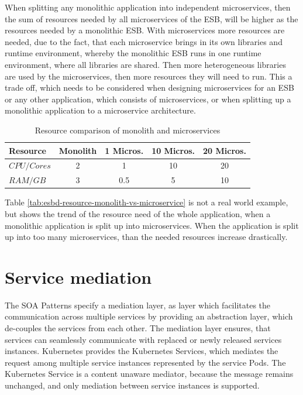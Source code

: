 When splitting any monolithic application into independent microservices, then the sum of resources needed by all microservices of the ESB, will be higher as the resources needed by a monolithic ESB. With microservices more resources are needed, due to the fact, that each microservice brings in its own libraries and runtime environment, whereby the monolithic ESB runs in one runtime environment, where all libraries are shared. Then more heterogeneous libraries are used by the microservices, then more resources they will need to run. This a trade off, which needs to be considered when designing microservices for an ESB or any other application, which consists of microservices, or when splitting up a monolithic application to a microservice architecture.
\newpage
{\renewcommand{\arraystretch}{1.2}%
%
	\begin{table}[h]
		\begin{tabularx}{\textwidth}{ m|c|c|c|c }	
			\textbf{Resource}    & \textbf{Monolith} & \textbf{1 Micros.} & \textbf{10 Micros.} & \textbf{20 Micros.} \\  \hline
			\textit{$CPU/Cores$} & 2                 & 1                  & 10                  & 20 \\
			\textit{$RAM/GB$}    & 3                 & 0.5                & 5                   & 10 \\ \hline
		\end{tabularx}
		\caption{Resource comparison of monolith and microservices}
		\label{tab:esbd-resource-monolith-vs-microservice}
\end{table}}

Table \vref{tab:esbd-resource-monolith-vs-microservice} is not a real world example, but shows the trend of the resource need of the whole application, when a monolithic application is split up into microservices. When the application is split up into too many microservices, than the needed resources increase drastically. \\

\section{Service mediation}
\label{sec:esbd-service-mediation}
The SOA Patterns specify a mediation layer, as layer which facilitates the communication across multiple services by providing an abstraction layer, which de-couples the services from each other. The mediation layer ensures, that services can seamlessly communicate with replaced or newly released services instances. Kubernetes provides the Kubernetes Services, which mediates the request among multiple service instances represented by the service Pods. The Kubernetes Service is a content unaware mediator, because the message remains unchanged, and only mediation between service instances is supported.

